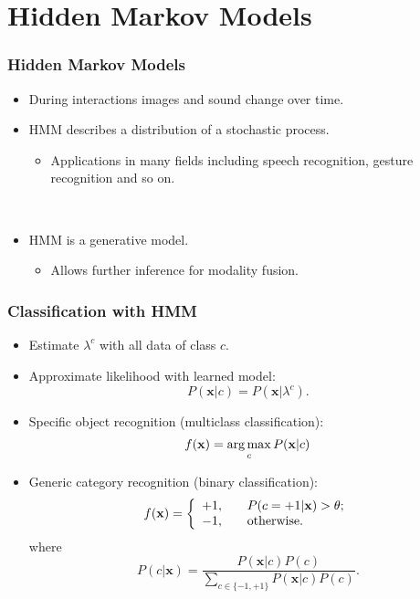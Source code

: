 \documentclass{beamer}
\begin{document}
\section{Hidden Markov Models}
\begin{frame}
  \frametitle{Hidden Markov Models}

  \begin{itemize}
    \item During interactions images and sound change over time.
    \item HMM describes a distribution of a stochastic process.
      \begin{itemize}
        \item Applications in many fields including speech recognition, gesture recognition and so on. 
      \end{itemize}
      ~

    \item HMM is a generative model.
      \begin{itemize}
        \item Allows further inference for modality fusion. 
      \end{itemize}
  \end{itemize}
\end{frame}

\begin{frame}
  \frametitle{Classification with HMM}

  \begin{itemize}
    \item Estimate $\lambda^c$ with all data of class $c$.

    \item Approximate likelihood with learned model:
      \[ P(\mathbf{x}|c) = P(\mathbf{x}|\lambda^c) . \]
    \item Specific object recognition (multiclass classification):
      \[ f(\mathbf{x}) = \operatorname*{arg\,max}_{c} P(\mathbf{x}|c) \]
    \item Generic category recognition (binary classification):
      \[ 
        f(\mathbf{x}) = \left\{
          \begin{array}{l l}
            +1, & \quad P(c=+1|\mathbf{x}) > \theta; \\
            -1, & \quad \text{otherwise.}
          \end{array} \right.
      \]
        where
      \[ P(c|\mathbf{x}) = \frac{P(\mathbf{x}|c)P(c)}{\sum_{c \in \{-1,+1\}} P(\mathbf{x}|c)P(c)} . \]
  \end{itemize}
\end{frame}
\end{document}
